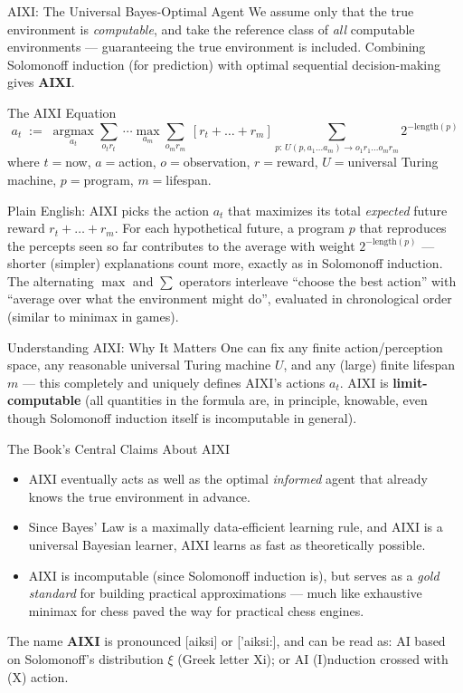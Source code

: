 \documentclass[aspectratio=169,10pt]{beamer}
\begin{document}
\begin{frame}{AIXI: The Universal Bayes-Optimal Agent}
  We assume only that the true environment is \emph{computable}, and take
  the reference class of \emph{all} computable environments --- guaranteeing
  the true environment is included. Combining Solomonoff induction (for
  prediction) with optimal sequential decision-making gives \textbf{AIXI}.

  \begin{block}{The AIXI Equation}
    \[
      a_t \;:=\; \operatorname*{argmax}_{a_t}\sum_{o_t r_t}\ \cdots
      \operatorname*{max}_{a_m}\sum_{o_m r_m}\ [r_t + \ldots + r_m]
      \sum_{p:\, U(p,a_1\ldots a_m)\to o_1 r_1 \ldots o_m r_m} 2^{-\mathrm{length}(p)}
    \]
    where $t{=}$now, $a{=}$action, $o{=}$observation, $r{=}$reward,
    $U{=}$universal Turing machine, $p{=}$program, $m{=}$lifespan.
  \end{block}
  Plain English: AIXI picks the action $a_t$ that maximizes its total
  \emph{expected} future reward $r_t + \ldots + r_m$. For each hypothetical
  future, a program $p$ that reproduces the percepts seen so far contributes
  to the average with weight $2^{-\mathrm{length}(p)}$ --- shorter (simpler)
  explanations count more, exactly as in Solomonoff induction. The
  alternating $\max$ and $\sum$ operators interleave ``choose the best
  action'' with ``average over what the environment might do'', evaluated
  in chronological order (similar to minimax in games).
\end{frame}

\begin{frame}{Understanding AIXI: Why It Matters}
  One can fix any finite action/perception space, any reasonable universal
  Turing machine $U$, and any (large) finite lifespan $m$ --- this completely
  and uniquely defines AIXI's actions $a_t$. AIXI is \textbf{limit-computable}
  (all quantities in the formula are, in principle, knowable, even though
  Solomonoff induction itself is incomputable in general).

  \begin{block}{The Book's Central Claims About AIXI}
    \begin{itemize}
      \item AIXI eventually acts as well as the optimal \emph{informed} agent
        that already knows the true environment in advance.
      \item Since Bayes' Law is a maximally data-efficient learning rule, and
        AIXI is a universal Bayesian learner, AIXI learns as fast as
        theoretically possible.
      \item AIXI is incomputable (since Solomonoff induction is), but serves
        as a \emph{gold standard} for building practical approximations ---
        much like exhaustive minimax for chess paved the way for practical
        chess engines.
    \end{itemize}
  \end{block}
  The name \textbf{AIXI} is pronounced [aiksi] or ['aiksi:], and can be read
  as: AI based on Solomonoff's distribution $\xi$ (Greek letter Xi); or AI
  (I)nduction crossed with (X) action.
\end{frame}
\end{document}
